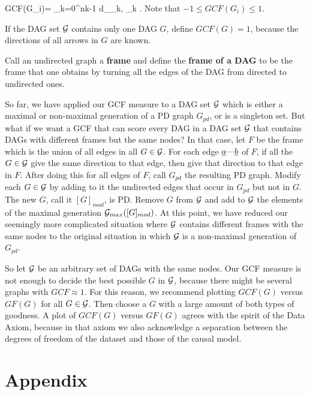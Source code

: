 \documentclass[12pt]{article}
\newcommand{\link }[0]{\text{---}}
\begin{document}
\beq
GCF(G_i)= 
\frac{
\sum_{k=0}^{nk-1}
\rho_{G_i}(\rva_k\link \rvb_k)
d_{\rva_k, \rvb_k}
}
{
\sum_{k=0}^{nk-1}
d_{\rva_k, \rvb_k}
}
\;.
\label{eq-rel-gfc}
\eeq
Note that
$-1\leq GCF(G_i)  \leq 1$.

If the DAG set ${\cal G}$ 
contains only one DAG $G$,
define $GCF(G)=1$, because the
directions of 
all arrows in $G$ are known.

Call an undirected graph a {\bf frame}
and define the
{\bf frame of a DAG}
to be the frame that one obtains
by turning
all the edges of the DAG from directed 
to undirected ones.

So far, we 
have applied our GCF measure
 to a DAG set ${\cal G}$
which is
either a maximal or 
non-maximal generation
of  a PD graph $G_{pd}$,
or is a singleton set.
But what if we want a GCF
that can score every DAG
in a  DAG set
${\cal G}$ that contains
DAGs with different frames
but the same nodes?
In that case, 
let $F$
be the frame
which 
is the union of 
all edges in all $G\in {\cal G}$.
For each edge $\rva\link \rvb$ of $F$,
if all the $G\in {\cal G}$
give the same direction
to that edge, then give that direction
to that edge in $F$.
After doing this for
all edges of $F$,
call $G_{pd} $ the resulting 
PD graph.
Modify each $G\in {\cal G}$
by adding to it the undirected edges
that occur in $G_{pd}$
but not in $G$.
The new $G$, call it $[G]_{mod}$,
is PD. Remove $G$ from ${\cal G}$
and add to ${\cal G}$
the elements of
the maximal generation ${\cal G}_{max}([G]_{mod})$.
At this point,
we have reduced our
seemingly more 
complicated situation
where ${\cal G}$ contains
different frames with the same nodes
to the original situation
in which ${\cal G}$
is a non-maximal 
generation of $G_{pd}$.



So let ${\cal G}$
be an arbitrary set of
DAGs with the same nodes.
Our GCF  measure
is not enough to
decide the best 
possible $G$ in ${\cal G}$,
because there might 
be several graphs with 
$GCF\approx 1$.
For this reason,
we recommend
plotting $GCF(G)$ 
versus $GF(G)$
for all $G\in{\cal G}$.
Then  choose a $G$ with a
large amount
of both types of goodness.
A plot of 
$GCF(G)$
versus $GF(G)$
agrees with the spirit of
the Data 
Axiom,
because in that axiom 
we also acknowledge a separation between the
degrees of freedom of the
dataset  and 
those of the causal model.

\appendix

\section{Appendix}
\end{document}
